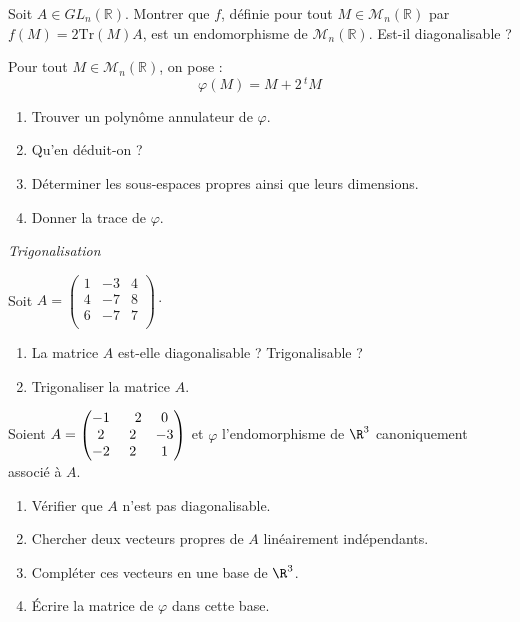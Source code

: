 \documentclass[a4paper,10pt]{report}
\begin{document}
\begin{Exercice}{} Soit $A \in GL_n(\mathbb{R})$. Montrer que $f$, définie pour tout $M \in \mathcal{M}_n(\mathbb{R})$ par $f(M)= 2 \textrm{Tr}(M) A$, est un endomorphisme de $\mathcal{M}_n(\mathbb{R})$. Est-il diagonalisable ?
\end{Exercice}


\begin{Exercice}{}  Pour tout $M \in \mathcal{M}_n(\mathbb{R})$, on pose :
$$ \varphi(M) = M +2 \, {}^t M$$
\begin{enumerate}
\item Trouver un polynôme annulateur de $\varphi$.
\item Qu'en déduit-on ?
\item Déterminer les sous-espaces propres ainsi que leurs dimensions.
\item Donner la trace de $\varphi$.
\end{enumerate}
\end{Exercice}



\medskip

\begin{center}
\textit{{ {\large Trigonalisation}}}
\end{center}

\medskip

\begin{Exercice}{} Soit $A= \begin{pmatrix}
1 & -3 & 4 \\
4 & -7 & 8 \\
6 & -7 & 7 \\
\end{pmatrix}\cdot$

\begin{enumerate}
\item La matrice $A$ est-elle diagonalisable ? Trigonalisable ?
\item Trigonaliser la matrice $A$. 
\end{enumerate}
\end{Exercice}


\begin{Exercice}{} Soient $A = \begin{pmatrix} -1 &\phantom-2 & 0 \cr 2 &2 &-3 \cr -2 &2 &1 \cr \end{pmatrix}$ et $\varphi$ l'endomorphisme de $\R^3$ canoniquement associé à $A$.

\begin{enumerate}
  \item Vérifier que $A$ n'est pas diagonalisable.
    
  \item Chercher deux vecteurs propres de $A$ linéairement indépendants.
    
  \item Compléter ces vecteurs en une base de $\R^3$.
    
  \item \'Ecrire la matrice de $\varphi$ dans cette base.
        
\end{enumerate}
\end{Exercice} 
\end{document}

